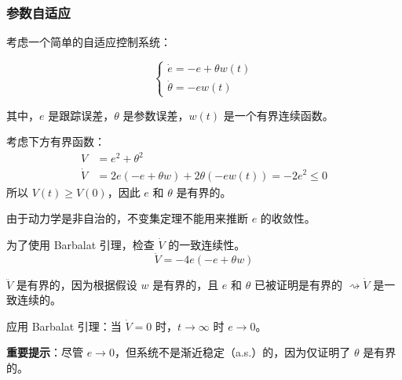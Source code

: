 \begin{frame}
    \frametitle{参数自适应}

    考虑一个简单的自适应控制系统：

    \[
    \begin{cases}
    \dot{e} = -e + \theta w(t) \\
    \dot{\theta} = -e w(t)
    \end{cases}
    \]

    其中，\( e \) 是跟踪误差，\( \theta \) 是参数误差，\( w(t) \) 是一个有界连续函数。
\end{frame}

\begin{frame}
考虑下方有界函数：
\[
\begin{split}
V &= e^2 + \theta^2 \\
\dot{V} &= 2e(-e + \theta w) + 2\theta(-ew(t)) = -2e^2 \leq 0
\end{split}
\]
所以 \( V(t) \geq V(0) \)，因此 \( e \) 和 \( \theta \) 是有界的。

由于动力学是非自治的，不变集定理不能用来推断 \( e \) 的收敛性。

为了使用 Barbalat 引理，检查 \( \dot{V} \) 的一致连续性。
\[
\ddot{V} = -4e(-e + \theta w)
\]

\( \ddot{V} \) 是有界的，因为根据假设 \( w \) 是有界的，且 \( e \) 和 \( \theta \) 已被证明是有界的 \( \rightsquigarrow \dot{V} \) 是一致连续的。

应用 Barbalat 引理：当 \( \dot{V} = 0 \) 时，\( t \to \infty \) 时 \( e \to 0 \)。

\textbf{重要提示}：尽管 \( e \to 0 \)，但系统不是渐近稳定（a.s.）的，因为仅证明了 \( \theta \) 是有界的。
\end{frame}



